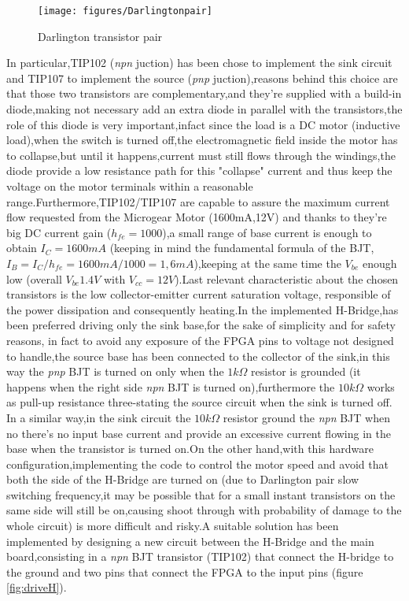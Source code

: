 \begin{figure}[!ht]
	\centering
	\texttt{[image: figures/Darlingtonpair]}
	\caption{Darlington transistor pair}
	\label{fig:darlington}
\end{figure}

In particular,TIP102 (\emph{npn} juction) has been chose to implement the sink circuit and TIP107 to implement the source (\emph{pnp} juction),reasons behind this choice are that those two transistors are complementary,and they're supplied with a build-in diode,making not necessary add an extra diode in parallel with the transistors,the role of this diode is very important,infact since the load is a DC motor (inductive load),when the switch is turned off,the electromagnetic field inside the motor has to collapse,but until it happens,current must still flows through the windings,the diode provide a low resistance path for this "collapse" current and thus keep the voltage on the motor terminals within a  reasonable range.Furthermore,TIP102/TIP107 are capable to assure the maximum current flow requested from the Microgear Motor (1600mA,12V) and thanks to they're big DC current gain ($h_{fe}=1000$),a small range of base current is enough to obtain $I_C=1600mA$ (keeping in mind the fundamental formula of the BJT,$I_B=I_C/h_{fe}=1600mA/1000=1,6mA$),keeping at the same time the $V_{be}$ enough low (overall $V_{be}1.4 V$ with $V_{cc}=12 V$).Last relevant characteristic about the chosen transistors is the low collector-emitter current saturation voltage, responsible of the power dissipation and consequently heating.In the implemented H-Bridge,has been preferred driving only the sink base,for the sake of simplicity and for safety reasons, in fact to avoid any exposure of the FPGA pins to voltage not designed to handle,the source base has been connected to the collector of the sink,in this way the \emph{pnp} BJT is turned on only when the $ 1k\Omega $ resistor is grounded (it happens when the right side \emph{npn} BJT is turned on),furthermore the $ 10k\Omega $ works as pull-up resistance three-stating the source circuit when the sink is turned off. In a similar way,in the sink circuit the $ 10k\Omega $ resistor ground the \emph{npn} BJT when no there's no input base current and provide an excessive current flowing in the base when the transistor is turned on.On the other hand,with this hardware configuration,implementing the code to control the motor speed and avoid that both the side of the H-Bridge are turned on (due to Darlington pair slow switching frequency,it may be possible that for a small instant transistors on the same side will still be on,causing shoot through with probability of damage to the whole circuit) is more difficult and risky.A suitable solution has been implemented by designing a new circuit  between the H-Bridge and the main board,consisting in a \emph{npn} BJT transistor (TIP102) that connect the H-bridge to the ground and two pins that connect the FPGA to the input pins (figure  \ref{fig:driveH}).

